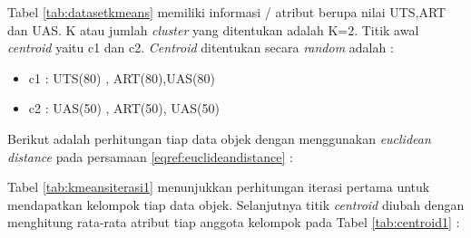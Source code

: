 \documentclass[a4paper,twoside]{article}
\begin{document}
\begin{enumerate}
Tabel \ref{tab:datasetkmeans} memiliki informasi  / atribut berupa nilai UTS,ART dan UAS. K atau jumlah \textit{cluster} yang ditentukan adalah K=2. Titik awal \textit{centroid} yaitu c1 dan c2. \textit{Centroid}  ditentukan secara \textit{random} adalah :

\begin{itemize}
\item c1 : UTS(80) , ART(80),UAS(80)
\item c2 : UAS(50) , ART(50), UAS(50)
\end{itemize}
\pagebreak
Berikut adalah perhitungan tiap data objek dengan menggunakan \textit{euclidean distance} pada persamaan \eqref{eqref:euclideandistance} : 

\begin{table}[ht]
\centering
{}
\caption{perhitungan k-Means iterasi ke-1}
\label{tab:kmeansiterasi1}
\end{table} 

Tabel \ref{tab:kmeansiterasi1} menunjukkan perhitungan iterasi pertama untuk mendapatkan kelompok tiap data objek. Selanjutnya titik \textit{centroid} diubah dengan menghitung rata-rata atribut tiap anggota kelompok
pada Tabel \ref{tab:centroid1} :


\end{enumerate}
\end{document}
